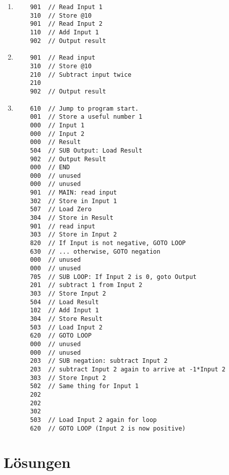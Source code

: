 \cprotEnv\begin{solution}
    \begin{enumerate}[label=\alph*)]
        \item \begin{verbatim}
    901  // Read Input 1
    310  // Store @10
    901  // Read Input 2
    110  // Add Input 1
    902  // Output result
        \end{verbatim}
        
        \item  \begin{verbatim}
    901  // Read input
    310  // Store @10
    210  // Subtract input twice
    210
    902  // Output result
        \end{verbatim}

        \item \begin{verbatim}
    610  // Jump to program start.
    001  // Store a useful number 1
    000  // Input 1
    000  // Input 2
    000  // Result
    504  // SUB Output: Load Result 
    902  // Output Result
    000  // END
    000  // unused
    000  // unused
    901  // MAIN: read input
    302  // Store in Input 1
    507  // Load Zero
    304  // Store in Result
    901  // read input
    303  // Store in Input 2
    820  // If Input is not negative, GOTO LOOP
    630  // ... otherwise, GOTO negation
    000  // unused
    000  // unused
    705  // SUB LOOP: If Input 2 is 0, goto Output
    201  // subtract 1 from Input 2
    303  // Store Input 2
    504  // Load Result
    102  // Add Input 1
    304  // Store Result
    503  // Load Input 2
    620  // GOTO LOOP
    000  // unused
    000  // unused
    203  // SUB negation: subtract Input 2
    203  // subtract Input 2 again to arrive at -1*Input 2
    303  // Store Input 2
    502  // Same thing for Input 1
    202
    202
    302
    503  // Load Input 2 again for loop
    620  // GOTO LOOP (Input 2 is now positive)
           \end{verbatim}
    \end{enumerate}
\end{solution}  

\newpage

\section*{Lösungen}
\printsolutions




